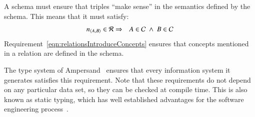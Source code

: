 \documentclass{elsarticle}
\begin{document}
   A schema must ensure that triples ``make sense'' in the semantics defined by the schema.
   This means that it must satisfy:
\begin{eqnarray}
   \text{\it n\/}_{\langle{A},{B}\rangle}\in\mathcal{R}&\Rightarrow&A\in\mathcal{C}\ \wedge\ B\in\mathcal{C}
   \label{eqn:relationsIntroduceConcepts}
\end{eqnarray}
   Requirement~\ref{eqn:relationsIntroduceConcepts} ensures that concepts mentioned in a relation are defined in the schema.

   The type system of Ampersand~\cite{vdWoude2011} ensures that every information system it generates satisfies this requirement.
   Note that these requirements do not depend on any particular data set,
   so they can be checked at compile time.
   This is also known as static typing,
   which has well established advantages for the software engineering process~\cite{HanenbergKRTS14,Petersen2014}.

\end{document}

